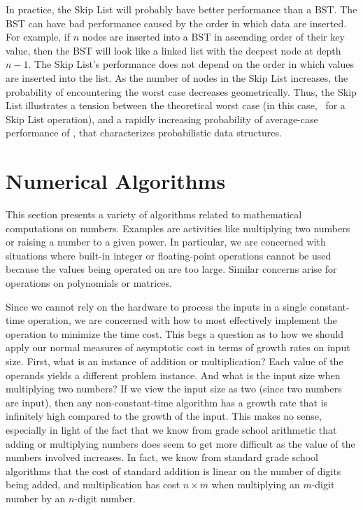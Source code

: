 \newpage

In practice, the Skip List will probably have better
performance than a BST.
The BST can have bad performance caused by the order in which data are
inserted.
For example, if \(n\) nodes are inserted into a BST in ascending order 
of their key value, then the BST will look like a linked list with the 
deepest node at depth \(n-1\).
The Skip List's performance does not depend on the order in which
values are inserted into the list.
As the number of nodes in the Skip List increases, the probability of
encountering the worst case decreases
geometrically. 
Thus, the Skip List illustrates a tension between the theoretical
worst case (in this case, \Thetan\ for a Skip List operation), and
a rapidly increasing probability of average-case performance of
\Thetalogn, that characterizes probabilistic data structures.


\section{Numerical Algorithms}
\label{Sec:Numerical}

This section presents a variety of algorithms related to mathematical
computations on numbers.
Examples are activities like multiplying two numbers or raising a
number to a given power.
In particular, we are concerned with situations where built-in integer
or floating-point operations cannot be used because the values being
operated on are too large.
Similar concerns arise for operations on polynomials or matrices.

Since we cannot rely on the hardware to process the inputs in a single
constant-time operation, we are concerned with how to most effectively
implement the operation to minimize the time cost.
This begs a question as to how we should apply our normal measures of
asymptotic cost in terms of growth rates on input size.
First, what is an instance of addition or multiplication?
Each value of the operands yields a different problem instance.
And what is the input size when multiplying two numbers?
If we view the input size as two (since two numbers are input),
then any non-constant-time algorithm has a growth rate that is
infinitely high compared to the growth of the input.
This makes no sense, especially in light of the fact that we know from
grade school arithmetic that adding or multiplying numbers does seem
to get more difficult as the value of the numbers involved increases.
In fact, we know from standard grade school algorithms that the cost of
standard addition is linear on the number of digits being added, and
multiplication has cost $n \times m$ when multiplying an $m$-digit
number by an $n$-digit number.

